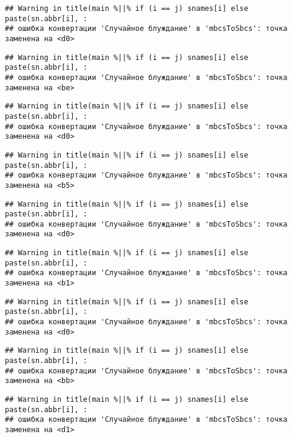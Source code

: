 \documentclass[
]{article}
\begin{document}
\begin{verbatim}
## Warning in title(main %||% if (i == j) snames[i] else paste(sn.abbr[i], :
## ошибка конвертации 'Случайное блуждание' в 'mbcsToSbcs': точка заменена на <d0>
\end{verbatim}

\begin{verbatim}
## Warning in title(main %||% if (i == j) snames[i] else paste(sn.abbr[i], :
## ошибка конвертации 'Случайное блуждание' в 'mbcsToSbcs': точка заменена на <be>
\end{verbatim}

\begin{verbatim}
## Warning in title(main %||% if (i == j) snames[i] else paste(sn.abbr[i], :
## ошибка конвертации 'Случайное блуждание' в 'mbcsToSbcs': точка заменена на <d0>
\end{verbatim}

\begin{verbatim}
## Warning in title(main %||% if (i == j) snames[i] else paste(sn.abbr[i], :
## ошибка конвертации 'Случайное блуждание' в 'mbcsToSbcs': точка заменена на <b5>
\end{verbatim}

\begin{verbatim}
## Warning in title(main %||% if (i == j) snames[i] else paste(sn.abbr[i], :
## ошибка конвертации 'Случайное блуждание' в 'mbcsToSbcs': точка заменена на <d0>
\end{verbatim}

\begin{verbatim}
## Warning in title(main %||% if (i == j) snames[i] else paste(sn.abbr[i], :
## ошибка конвертации 'Случайное блуждание' в 'mbcsToSbcs': точка заменена на <b1>
\end{verbatim}

\begin{verbatim}
## Warning in title(main %||% if (i == j) snames[i] else paste(sn.abbr[i], :
## ошибка конвертации 'Случайное блуждание' в 'mbcsToSbcs': точка заменена на <d0>
\end{verbatim}

\begin{verbatim}
## Warning in title(main %||% if (i == j) snames[i] else paste(sn.abbr[i], :
## ошибка конвертации 'Случайное блуждание' в 'mbcsToSbcs': точка заменена на <bb>
\end{verbatim}

\begin{verbatim}
## Warning in title(main %||% if (i == j) snames[i] else paste(sn.abbr[i], :
## ошибка конвертации 'Случайное блуждание' в 'mbcsToSbcs': точка заменена на <d1>
\end{verbatim}
\end{document}
